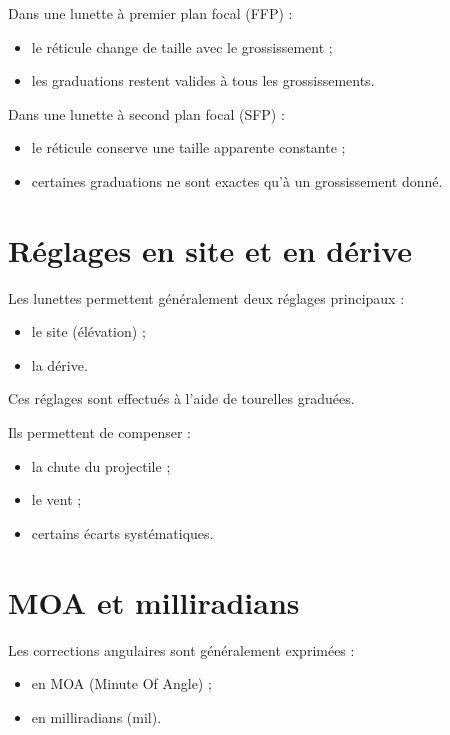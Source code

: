 Dans une lunette à premier plan focal (FFP) :

\begin{itemize}
    \item le réticule change de taille avec le grossissement ;
    \item les graduations restent valides à tous les grossissements.
\end{itemize}

Dans une lunette à second plan focal (SFP) :

\begin{itemize}
    \item le réticule conserve une taille apparente constante ;
    \item certaines graduations ne sont exactes qu'à un grossissement donné.
\end{itemize}

\section{Réglages en site et en dérive}

Les lunettes permettent généralement deux réglages principaux :

\begin{itemize}
    \item le site (élévation) ;
    \item la dérive.
\end{itemize}

Ces réglages sont effectués à l'aide de tourelles graduées.

Ils permettent de compenser :

\begin{itemize}
    \item la chute du projectile ;
    \item le vent ;
    \item certains écarts systématiques.
\end{itemize}

\section{MOA et milliradians}

Les corrections angulaires sont généralement exprimées :

\begin{itemize}
    \item en MOA (Minute Of Angle) ;
    \item en milliradians (mil).
\end{itemize}

